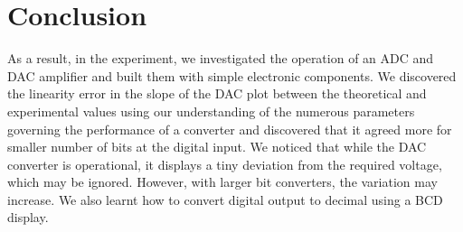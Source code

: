 \section{Conclusion}
	As a result, in the experiment, we investigated the operation of an ADC and DAC amplifier and built them with simple electronic components. We discovered the linearity error in the slope of the DAC plot between the theoretical and experimental values using our understanding of the numerous parameters governing the performance of a converter and discovered that it agreed more for smaller number of bits at the digital input. We noticed that while the DAC converter is operational, it displays a tiny deviation from the required voltage, which may be ignored. However, with larger bit converters, the variation may increase. We also learnt how to convert digital output to decimal using a BCD display.